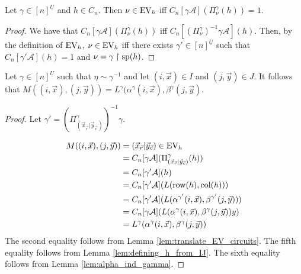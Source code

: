\documentclass[../paper.tex]{subfiles}
\begin{document}
\begin{lem}
  Let $\gamma\in [n]^{\underline{U}}$ and $h \in C_n$. Then $\nu \in \text{EV}_h$ iff
  $C_n[\gamma \mathcal{A}](\Pi^{\gamma}_\nu (h)) = 1$.
  \label{lem:translate_EV_circuits}
\end{lem}
\begin{proof}
  We have that $C_n[\gamma \mathcal{A}](\Pi^{\gamma}_\nu(h))$ iff
  $C_n[(\Pi^{\gamma}_{\nu})^{-1}\gamma \mathcal{A}] (h)$. Then, by the
  definition of $\text{EV}_h$, $\nu \in \text{EV}_h$ iff there exists $\gamma' \in
  [n]^{\underline{U}}$ such that $C_n[\gamma' \mathcal{A}](h) = 1$ and $\nu =
  \gamma\restriction{\text{sp}(h)}$.

\end{proof}


\begin{thm}
  Let $\gamma\in [n]^{\underline{U}}$ such that $\eta \sim \gamma^{-1}$ and let
  $(i, \vec{x})\in I$ and $(j, \vec{y})\in J$. It follows that $M((i, \vec{x}),
  (j, \vec{y})) = L^{\gamma}(\alpha^{\gamma}(i, \vec{x}), \beta^{\gamma}(j,
  \vec{y})$.
  \label{lem:ML-equal-elements}
\end{thm}
\begin{proof}
  Let $\gamma' = (\Pi^{\gamma}_{(\vec{x}_{\vec{r}} \vert
    \vec{y}_{\vec{c}})})^{-1} \gamma$.

  \begin{align*}
    M((i, \vec{x}), (j, \vec{y}))
    &= (\vec{x}_{\vec{r}} \vert \vec{y}_{\vec{c}}) \in \text{EV}_h \\
    &= C_n[\gamma \mathcal{A}] (\Pi^{\gamma}_{(\vec{x}_{\vec{r}} \vert \vec{y}_{\vec{c}})} (h)) \\
    &= C_n[\gamma' \mathcal{A}] (h) \\
    &= C_n[\gamma' \mathcal{A}](L(\text{row}(h), \text{col} (h)))\\
    &= C_n[\gamma' \mathcal{A}](L(\alpha^{\gamma'}(i, \vec{x}), \beta^{\gamma'}(j, \vec{y})))\\
    &= C_n[\gamma \mathcal{A}](L(\alpha^{\gamma}(i, \vec{x}), \beta^{\gamma}(j, \vec{y}))y)\\
    &= L^{\gamma}(\alpha^{\gamma}(i, \vec{x}), \beta^{\gamma}(j, \vec{y}))
  \end{align*}
  The second equality follows from Lemma \ref{lem:translate_EV_circuits}. The
  fifth equality follows from Lemma \ref{lem:defining_h_from_IJ}. The sixth
  equality follows from Lemma \ref{lem:alpha_ind_gamma}.
\end{proof}
\end{document}
